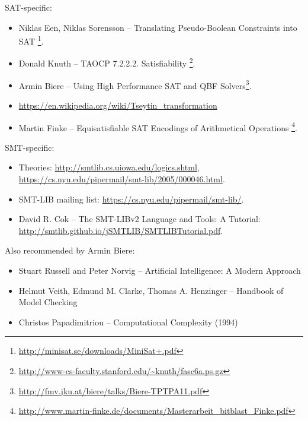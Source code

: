 SAT-specific:

\begin{itemize}

\item Niklas Een, Niklas Sorensson -- Translating Pseudo-Boolean Constraints into SAT
\footnote{\url{http://minisat.se/downloads/MiniSat+.pdf}}.

\item Donald Knuth -- \ac{TAOCP} 7.2.2.2. Satisfiability
\footnote{\url{http://www-cs-faculty.stanford.edu/~knuth/fasc6a.ps.gz}}.

\item Armin Biere -- Using High Performance SAT and QBF Solvers\footnote{\url{http://fmv.jku.at/biere/talks/Biere-TPTPA11.pdf}}.

\item \url{https://en.wikipedia.org/wiki/Tseytin_transformation}

\item Martin Finke -- Equisatisfiable SAT Encodings of Arithmetical Operations
\footnote{\url{http://www.martin-finke.de/documents/Masterarbeit_bitblast_Finke.pdf}}.

\end{itemize}

SMT-specific:

\begin{itemize}
\item Theories: \url{http://smtlib.cs.uiowa.edu/logics.shtml}, \url{https://cs.nyu.edu/pipermail/smt-lib/2005/000046.html}.

\item SMT-LIB mailing list: \url{https://cs.nyu.edu/pipermail/smt-lib/}.

\item David R. Cok -- The SMT-LIBv2 Language and Tools: A Tutorial: \url{http://smtlib.github.io/jSMTLIB/SMTLIBTutorial.pdf}.

\end{itemize}

Also recommended by Armin Biere:

\begin{itemize}
\item Stuart Russell and Peter Norvig -- Artificial Intelligence: A Modern Approach

\item Helmut Veith, Edmund M. Clarke, Thomas A. Henzinger -- Handbook of Model Checking

\item Christos Papadimitriou -- Computational Complexity (1994)
\end{itemize}


